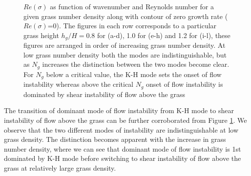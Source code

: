 \documentclass[aps,prl,twocolumn,showpacs,superscriptaddress,groupedaddress,10pt]{revtex4-1}  %
\newcommand{\hg}{h_g}
\begin{document}
\begin{figure}
\caption{$Re(\sigma)$ as function of wavenumber and Reynolds number for a given grass number density along with contour of zero growth rate ($Re(\sigma)$=0). The figures in each 
row corresponds to a particular grass height $\hg/H = 0.8$ for (a-d), 1.0 for (e-h) and  1.2 for (i-l), these figures are arranged in order of increasing grass 
number density. At low grass number density both the modes are indistinguishable, but as $N_g$ increases the distinction between the two modes become clear. For $N_g$ below
a critical value, the K-H mode sets the onset of flow instability whereas above the critical $N_{g}$ onset of flow instability is dominated by shear instability of flow above the grass}
\label{K_Re_sigma_set3}
\end{figure}

The transition of dominant mode of flow instability from K-H mode to shear instability of flow above the grass can be further corroborated from Figure \ref{K_Re_sigma_set3}.
We observe that the two different modes of instability are indistinguishable at low grass density. The distinction becomes apparent with the increase in grass number density, where we 
can see that dominant mode of flow instability is 1st dominated by K-H mode before switching to shear instability of flow above the grass at relatively large grass density.  
\end{document}

